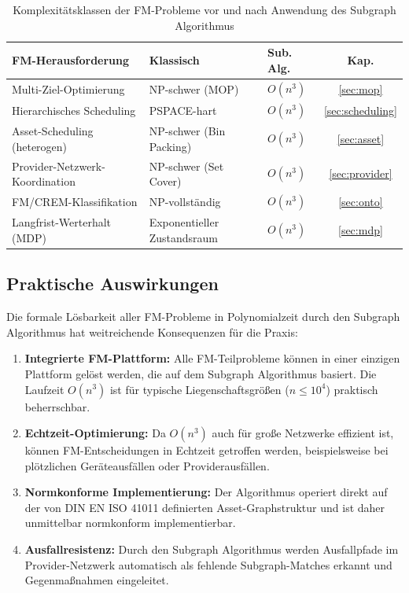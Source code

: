 ﻿\documentclass[a4paper,12pt]{article}
\theoremstyle{definition}
\begin{document}
\begin{table}[h]
\centering
\caption{Komplexitätsklassen der FM-Probleme vor und nach Anwendung des Subgraph Algorithmus}
\label{tab:komplex}
\begin{tabular}{lllc}
\toprule
\textbf{FM-Herausforderung} & \textbf{Klassisch} & \textbf{Sub. Alg.} & \textbf{Kap.} \\
\midrule
Multi-Ziel-Optimierung & NP-schwer (MOP) & $O(n^3)$ & \ref{sec:mop} \\
Hierarchisches Scheduling & PSPACE-hart & $O(n^3)$ & \ref{sec:scheduling} \\
Asset-Scheduling (heterogen) & NP-schwer (Bin Packing) & $O(n^3)$ & \ref{sec:asset} \\
Provider-Netzwerk-Koordination & NP-schwer (Set Cover) & $O(n^3)$ & \ref{sec:provider} \\
FM/CREM-Klassifikation & NP-vollständig & $O(n^3)$ & \ref{sec:onto} \\
Langfrist-Werterhalt (MDP) & Exponentieller Zustandsraum & $O(n^3)$ & \ref{sec:mdp} \\
\bottomrule
\end{tabular}
\end{table}

\subsection{Praktische Auswirkungen}

Die formale Lösbarkeit aller FM-Probleme in Polynomialzeit durch den
Subgraph Algorithmus hat weitreichende Konsequenzen für die Praxis:

\begin{enumerate}
    \item \textbf{Integrierte FM-Plattform:} Alle FM-Teilprobleme können in einer
          einzigen Plattform gelöst werden, die auf dem Subgraph Algorithmus basiert.
          Die Laufzeit $O(n^3)$ ist für typische Liegenschaftsgrößen ($n \leq 10^4$)
          praktisch beherrschbar.

    \item \textbf{Echtzeit-Optimierung:} Da $O(n^3)$ auch für große Netzwerke
          effizient ist, können FM-Entscheidungen in Echtzeit getroffen werden,
          beispielsweise bei plötzlichen Geräteausfällen oder Providerausfällen.

    \item \textbf{Normkonforme Implementierung:} Der Algorithmus operiert direkt
          auf der von DIN EN ISO 41011 definierten Asset-Graphstruktur und ist
          daher unmittelbar normkonform implementierbar.

    \item \textbf{Ausfallresistenz:} Durch den Subgraph Algorithmus werden
          Ausfallpfade im Provider-Netzwerk automatisch als fehlende Subgraph-Matches
          erkannt und Gegenmaßnahmen eingeleitet.
\end{enumerate}
\end{document}
